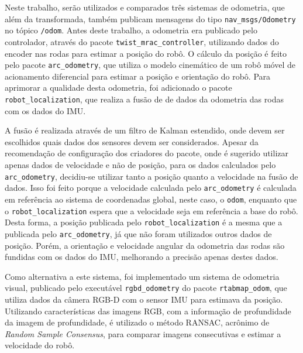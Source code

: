 \documentclass[repeatfields,xlists,xpacks,oneside,yearsonly]{ufrgscca}
\begin{document}
Neste trabalho, serão utilizados e comparados três sistemas de odometria,
que além da transformada, também publicam mensagens do tipo
\texttt{nav\_msgs/Odometry} no tópico \texttt{/odom}.
Antes deste trabalho, a odometria era publicado pelo controlador,
através do pacote \texttt{twist\_mrac\_controller}, utilizando
dados do encoder nas rodas para estimar a posição do robô.
O cálculo da posição é feito pelo pacote \texttt{arc\_odometry}, que utiliza
o modelo cinemático de um robô móvel de acionamento diferencial
para estimar a posição e orientação do robô.
Para aprimorar a qualidade desta odometria, foi adicionado o pacote
\texttt{robot\_localization}, que realiza a fusão de
de dados da odometria das rodas com os dados do IMU.

A fusão é realizada através de um filtro de Kalman estendido, onde devem
ser escolhidos quais dados dos sensores devem ser considerados.
Apesar da recomendação de configuração dos criadores do pacote, onde é
sugerido utilizar apenas dados de velocidade e não de posição,
para os dados calculados pelo \texttt{arc\_odometry}, decidiu-se utilizar
tanto a posição quanto a velocidade na fusão de dados.
Isso foi feito porque a velocidade calculada pelo \texttt{arc\_odometry}
é calculada em referência ao sistema de coordenadas global, neste caso, o \texttt{odom},
enquanto que o \texttt{robot\_localization} espera que a velocidade seja em referência
a base do robô.
Desta forma, a posição publicada pelo \texttt{robot\_localization} é a mesma que a
publicada pelo \texttt{arc\_odometry}, já que não foram utilizados outros dados de posição.
Porém, a orientação e velocidade angular da odometria das rodas são fundidas com os dados
do IMU, melhorando a precisão apenas destes dados.


Como alternativa a este sistema, foi implementado um sistema de odometria visual,
publicado pelo executável \texttt{rgbd\_odometry} do pacote
\texttt{rtabmap\_odom}, que utiliza dados da câmera RGB-D com
o sensor IMU para estimava da posição.
Utilizando
características das imagens RGB, com a informação de profundidade
da imagem de profundidade, é utilizado o método RANSAC, acrônimo de
\textit{Random Sample Consensus}, para comparar imagens consecutivas e estimar
a velocidade do robô.
\end{document}
